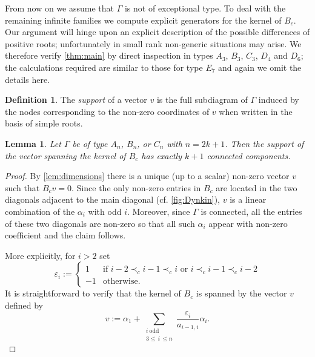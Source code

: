\documentclass[11pt]{amsart}
\newtheorem{lemma}[theorem]{Lemma}
\theoremstyle{definition}
\newtheorem{definition}[theorem]{Definition}
\numberwithin{equation}{section}
\numberwithin{figure}{section}
\begin{document}
  From now on we assume that $\Gamma$ is not of exceptional type.
  To deal with the remaining infinite families we compute explicit generators for the kernel of $B_c$.
  Our argument will hinge upon an explicit description of the possible differences of positive roots; unfortunately in small rank non-generic situations may arise.
  We therefore verify \cref{thm:main} by direct inspection in types $A_3$, $B_3$, $C_3$, $D_4$ and $D_6$; the calculations required are similar to those for type $E_7$ and again we omit the details here.

  \begin{definition}
    The \emph{support} of a vector $v$ is the full subdiagram of $\Gamma$ induced by the nodes corresponding to the non-zero coordinates of $v$ when written in the basis of simple roots.
  \end{definition}

  \begin{lemma}
    Let $\Gamma$ be of type $A_n$, $B_n$, or $C_n$ with $n=2k+1$.
    Then the support of the vector spanning the kernel of $B_c$ has exactly $k+1$ connected components.
  \end{lemma}
  \begin{proof}
    By \cref{lem:dimensions} there is a unique (up to a scalar) non-zero vector $v$ such that $B_cv=0$.
    Since the only non-zero entries in $B_c$ are located in the two diagonals adjacent to the main diagonal (cf. \cref{fig:Dynkin}), $v$ is a linear combination of the $\alpha_i$ with odd $i$.
    Moreover, since $\Gamma$ is connected, all the entries of these two diagonals are non-zero so that all such $\alpha_i$ appear with non-zero coefficient and the claim follows.

    More explicitly, for $i>2$ set
    \[
      \varepsilon_i :=
      \begin{cases}
        1 & \text{if $i-2\prec_c i-1 \prec_c i$ or $i\prec_c i-1 \prec_c i-2$}\\
        -1 & \text{otherwise.}
      \end{cases}
    \]
    It is straightforward to verify that the kernel of $B_c$ is spanned by the vector $v$ defined by
    \begin{equation}
      \label{eq:vector}
      v :=
      \alpha_1 + \sum_{\substack{i\ \mathrm{odd}\\ 3\le\, i\,\leq n}} \frac{\varepsilon_i}{a_{i-1,i}} \alpha_i.
    \end{equation}
  \end{proof}
\end{document}
